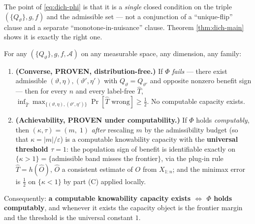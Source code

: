 The point of \eqref{eq:dich-phi} is that it is a \emph{single} closed condition on
the triple $(\{Q_\vartheta\},g,f)$ and the admissible set --- not a conjunction of a
``unique-flip'' clause and a separate ``monotone-in-nuisance'' clause. Theorem
\ref{thm:dich-main} shows it is exactly the right one.

\begin{theorem}
\label{thm:dich-main}
For any $(\{Q_\vartheta\},g,f,\mathcal A)$ on any measurable space, any dimension, any
family:
\begin{enumerate}\itemsep2pt
\item[\textnormal{(C)}] \textbf{(Converse, PROVEN, distribution-free.)} If $\Phi$
\emph{fails} --- there exist admissible $(\vartheta,\eta),(\vartheta',\eta')$ with
$Q_\vartheta=Q_{\vartheta'}$ and opposite nonzero benefit sign --- then for every $n$
and every label-free $\hat T$,
$\inf_{\hat T}\max_{\{(\vartheta,\eta),(\vartheta',\eta')\}}\Pr[\hat T\text{ wrong}]
   \ge\tfrac12$. No computable capacity exists.
\item[\textnormal{(A)}] \textbf{(Achievability, PROVEN under computability.)} If
$\Phi$ holds \emph{computably}, then $(\kappa,\tau)=(m,\;1)$ \emph{after} rescaling
$m$ by the admissibility budget (so that $\kappa=|m|/\varepsilon$) is a computable
knowability capacity with the \textbf{universal threshold $\tau=1$}: the population
sign of benefit is identifiable exactly on $\{\kappa>1\}=\{$admissible band misses the
frontier$\}$, via the plug-in rule $\hat T=h(\hat O)$, $\hat O$ a consistent estimate
of $O$ from $X_{1:n}$; and the minimax error is $\tfrac12$ on $\{\kappa<1\}$ by part
(C) applied locally.
\end{enumerate}
Consequently: \textbf{a computable knowability capacity exists $\iff$ $\Phi$ holds
computably}, and whenever it exists the capacity object is the frontier margin and
the threshold is the universal constant $1$.
\end{theorem}

